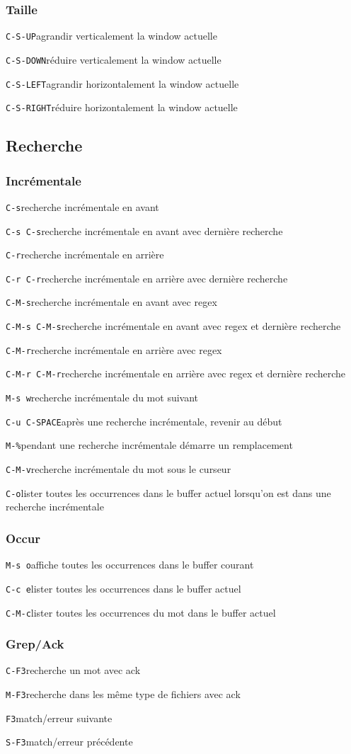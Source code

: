 \documentclass[10pt,landscape]{article}
\def\cm#1#2{{\tt#1}\dotfill#2\par}
\begin{document}
\begin{multicols}{3}
\subsubsection{Taille}
\cm{C-S-UP}{agrandir verticalement la window actuelle}
\cm{C-S-DOWN}{réduire verticalement la window actuelle}
\cm{C-S-LEFT}{agrandir horizontalement la window actuelle}
\cm{C-S-RIGHT}{réduire horizontalement la window actuelle}





\subsection{Recherche}

\subsubsection{Incrémentale}
\cm{C-s}{recherche incrémentale en avant}
\cm{C-s C-s}{recherche incrémentale en avant avec dernière recherche}
\cm{C-r}{recherche incrémentale en arrière}
\cm{C-r C-r}{recherche incrémentale en arrière avec dernière recherche}
\cm{C-M-s}{recherche incrémentale en avant avec regex}
\cm{C-M-s C-M-s}{recherche incrémentale en avant avec regex et dernière recherche}
\cm{C-M-r}{recherche incrémentale en arrière avec regex}
\cm{C-M-r C-M-r}{recherche incrémentale en arrière avec regex et dernière recherche}
\cm{M-s w}{recherche incrémentale du mot suivant}
\cm{C-u C-SPACE}{après une recherche incrémentale, revenir au début}
\cm{M-\%}{pendant une recherche incrémentale démarre un remplacement}
\cm{C-M-v}{recherche incrémentale du mot sous le curseur}
\cm{C-o}{lister toutes les occurrences dans le buffer actuel lorsqu'on est dans une recherche incrémentale}

\subsubsection{Occur}
\cm{M-s o}{affiche toutes les occurrences dans le buffer courant}
\cm{C-c e}{lister toutes les occurrences dans le buffer actuel}
\cm{C-M-c}{lister toutes les occurrences du mot dans le buffer actuel}

\subsubsection{Grep/Ack}
\cm{C-F3}{recherche un mot avec ack}
\cm{M-F3}{recherche dans les même type de fichiers avec ack}
\cm{F3}{match/erreur suivante}
\cm{S-F3}{match/erreur précédente}


\end{multicols}
\end{document}
